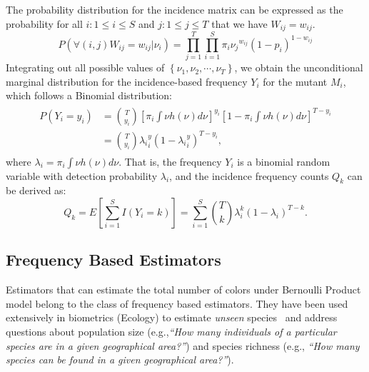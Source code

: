 \documentclass[sigconf,review,anonymous]{acmart}
\begin{document}
The probability distribution for the incidence matrix can be expressed as the
probability for all $i:1\leq i \leq S $ and $j:1\leq j\leq T$ that we have $W_{ij} = w_{ij}$.
\[
    P\left(\forall (i,j) W_{ij}=w_{ij}|\nu_{i} \right)= \prod_{j=1}^{T}\prod_{i=1}^{S} {\pi_i \nu_j}^{w_{ij}} (1-p_i)^{1-w_{ij}}
\]
Integrating out all possible values of $\left\{\nu_1, \nu_2,\cdots,\nu_T \right\}$, we obtain the unconditional marginal distribution for the incidence-based frequency $Y_i$ for the mutant $M_i$,
which follows a Binomial distribution:
\begin{gather*}
    \begin{split}
        P(Y_i=y_i)&={T \choose y_i}\left[\pi_i\int \nu h(\nu) d\nu\right]^{y_i} \left[1-\pi_i\int \nu h(\nu) d\nu \right]^{T-y_i} \\
        &={T \choose y_i}{\lambda_i}^y_i (1-{\lambda_i}^y_i)^{T-y_i},
    \end{split}
\end{gather*}
where  $\lambda_i=\pi_i \int \nu h(\nu)d\nu$.
That is, the frequency $Y_i$ is a binomial random variable with detection probability $\lambda_i$,
and the incidence frequency counts $Q_k$ can be derived as:
\[
    Q_k=E\left[ \sum_{i=1}^{S}I(Y_i=k)  \right]=\sum_{i=1}^{S}{T \choose k}\lambda_{i}^k(1-\lambda_{i})^{T-k}.
\]

\subsection{Frequency Based Estimators}
\label{sec:estimators}
Estimators that can estimate the total number of colors under Bernoulli Product model belong to the class of frequency based estimators.
They have been used extensively in biometrics (Ecology)
to estimate \emph{unseen} species~\cite{chao2016species} and
 address questions about population size %
 (e.g.,\emph{``How many individuals of a particular species are in a given geographical area?''})
and species richness %
 (e.g., \emph{``How many species can be found in a given geographical area?''}).
\end{document}
